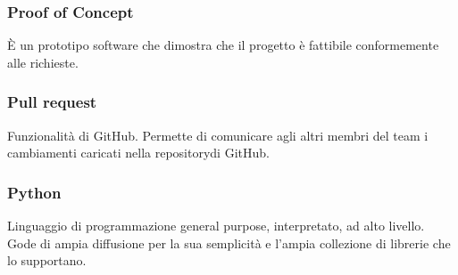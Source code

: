 \subsubsection*{Proof of Concept}
È un prototipo software che dimostra che il progetto è fattibile conformemente alle richieste.

\subsubsection*{Pull request}
Funzionalità di GitHub. Permette di comunicare agli altri membri del team i cambiamenti caricati nella repository\glosp di GitHub.

\subsubsection*{Python}
Linguaggio di programmazione general purpose, interpretato, ad alto livello. Gode di ampia diffusione per la sua semplicità e l'ampia collezione di librerie che lo supportano.

